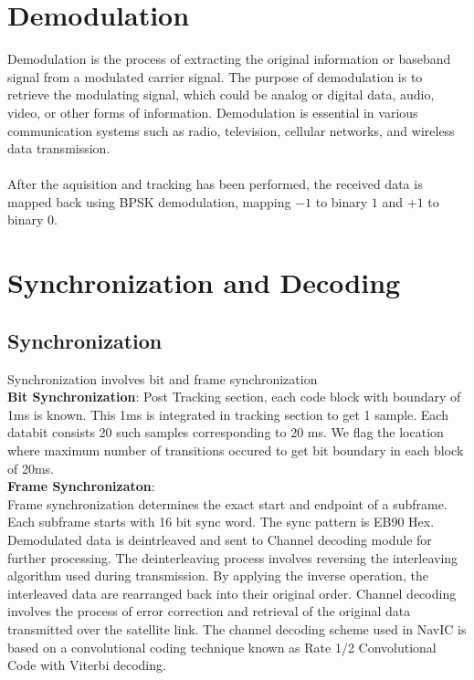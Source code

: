 \section{Demodulation}
Demodulation is the process of extracting the original information or baseband signal from a modulated carrier signal. The purpose of demodulation is to retrieve the modulating signal, which could be analog or digital data, audio, video, or other forms of information. Demodulation is essential in various communication systems such as radio, television, cellular networks, and wireless data transmission.
\\
\\
After the aquisition and tracking has been performed, the received data is mapped back using BPSK demodulation, mapping $-1$ to binary $1$ and $+1$ to binary $0$.

\section{Synchronization and Decoding}
\subsection{Synchronization}
Synchronization involves bit and frame synchronization
\\\textbf{Bit Synchronization}: %
Post Tracking section, each code block with boundary of 1ms is known. This 1ms is integrated in tracking section to get 1 sample. Each databit consists 20 such samples corresponding to 20 ms. We flag the location where maximum number of transitions occured to get bit boundary in each block of 20ms.\\
\textbf{Frame Synchronizaton}:\\
Frame synchronization determines the exact start and endpoint of a subframe. Each subframe starts with  16 bit sync word. The sync pattern is EB90 Hex.\\
Demodulated data is deintrleaved and sent to Channel decoding module for further processing. The deinterleaving process involves reversing the interleaving algorithm used during transmission. By applying the inverse operation, the interleaved data are rearranged back into their original order. 
Channel decoding involves the process of error correction and retrieval of the original data transmitted over the satellite link. The channel decoding scheme used in NavIC is based on a convolutional coding technique known as Rate 1/2 Convolutional Code with Viterbi decoding.
